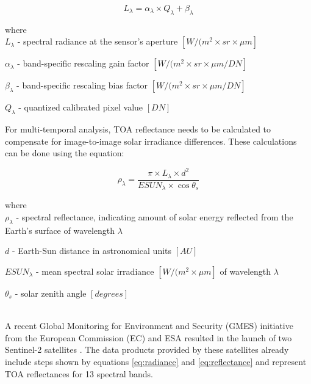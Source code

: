 \begin{samepage}
	\begin{equation}
	\label{eq:radiance}
	L_\lambda = \alpha_\lambda \times Q_\lambda + \beta_\lambda
	\end{equation}
	
	where
	\\
	
	$L_\lambda$ - spectral radiance at the sensor's aperture $[W/(m^2 \times sr \times \mu{m}]$
	
	$\alpha_\lambda$ - band-specific rescaling gain factor  $[W/(m^2 \times sr \times \mu{m} / DN]$
	
	$\beta_\lambda$ - band-specific rescaling bias factor  $[W/(m^2 \times sr \times \mu{m} / DN]$
	
	$Q_\lambda$ - quantized calibrated pixel value $[DN]$
	\\
\end{samepage}

For multi-temporal analysis, TOA reflectance needs to be calculated to compensate for image-to-image solar irradiance differences. These calculations can be done using the equation:

\begin{samepage}
	\begin{equation}
	\label{eq:reflectance}
	\rho_\lambda = \frac{\pi \times L_\lambda \times d^2}{ESUN_\lambda \times \cos \theta_s}
	\end{equation}
	
	where
	\\
	
	$\rho_\lambda$ - spectral reflectance, indicating amount of solar energy reflected from the Earth's surface of wavelength $\lambda$
	
	$d$ - Earth-Sun distance in astronomical units $[AU]$
	
	$ESUN_\lambda$ - mean spectral solar irradiance $[W/(m^2 \times \mu{m}]$ of wavelength $\lambda$
	
	$\theta_s$ - solar zenith angle $[degrees]$
\end{samepage}
\\

A recent Global Monitoring for Environment and Security (GMES) initiative from the European Commission (EC) and ESA resulted in the launch of two Sentinel-2 satellites \citet{drusch2012sentinel}. The data products provided by these satellites already include steps shown by equations \eqref{eq:radiance} and \eqref{eq:reflectance} and represent TOA reflectances for 13 spectral bands. 

